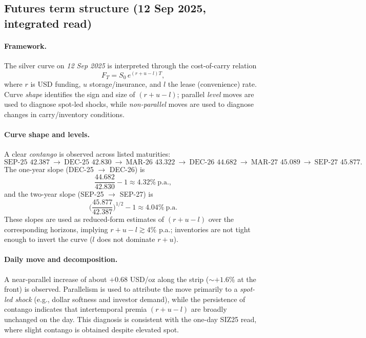 \documentclass[10pt,a4paper]{article} %
\begin{document}
\subsection{Futures term structure (12 Sep 2025, integrated read)}

\paragraph{Framework.}
The silver curve on \emph{12 Sep 2025} is interpreted through the cost-of-carry relation
\[
F_T = S_0\,e^{(r+u-l)T},
\]
where \(r\) is USD funding, \(u\) storage/insurance, and \(l\) the lease (convenience) rate. Curve \emph{shape} identifies the sign and size of \((r+u-l)\); parallel \emph{level} moves are used to diagnose spot-led shocks, while \emph{non-parallel} moves are used to diagnose changes in carry/inventory conditions.

\paragraph{Curve shape and levels.}
A clear \emph{contango} is observed across listed maturities:
\[
\text{SEP-25 } \mathbf{42.387}\ \rightarrow\ \text{DEC-25 } \mathbf{42.830}\ \rightarrow\ \text{MAR-26 } \mathbf{43.322}\ \rightarrow\ \text{DEC-26 } \mathbf{44.682}\ \rightarrow\ \text{MAR-27 } \mathbf{45.089}\ \rightarrow\ \text{SEP-27 } \mathbf{45.877}.
\]
The one-year slope (DEC-25 \(\rightarrow\) DEC-26) is
\[
\frac{44.682}{42.830}-1 \approx \mathbf{4.32\%}\ \text{p.a.},
\]
and the two-year slope (SEP-25 \(\rightarrow\) SEP-27) is
\[
\Big(\frac{45.877}{42.387}\Big)^{1/2}-1 \approx \mathbf{4.04\%}\ \text{p.a.}
\]
These slopes are used as reduced-form estimates of \((r+u-l)\) over the corresponding horizons, implying \(r+u-l\gtrsim 4\%\) p.a.; inventories are not tight enough to invert the curve (\(l\) does not dominate \(r+u\)).

\paragraph{Daily move and decomposition.}
A near-parallel increase of about \(\mathbf{+0.68}\) USD/oz along the strip (\(\sim \mathbf{+1.6\%}\) at the front) is observed. Parallelism is used to attribute the move primarily to a \emph{spot-led shock} (e.g., dollar softness and investor demand), while the persistence of contango indicates that intertemporal premia \((r+u-l)\) are broadly unchanged on the day. This diagnosis is consistent with the one-day SIZ25 read, where slight contango is obtained despite elevated spot.
\end{document}
